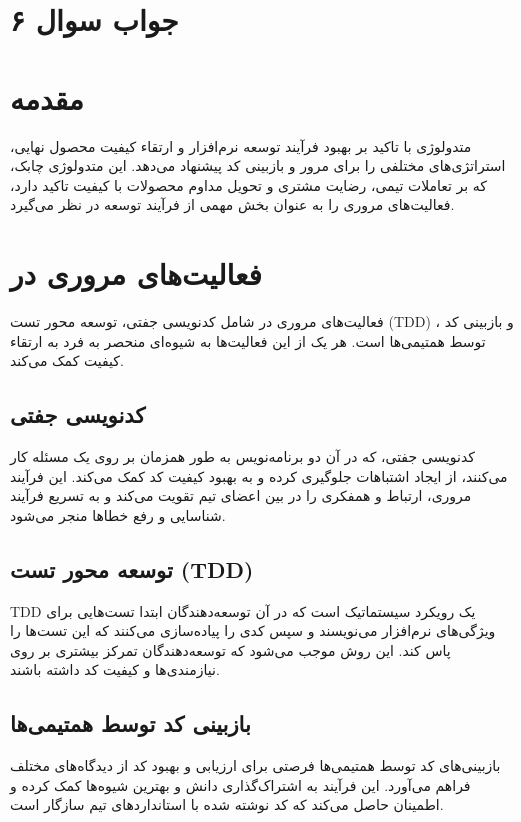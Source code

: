 \section*{جواب سوال ۶}

\section{مقدمه}
متدولوژی
با تاکید بر بهبود فرآیند توسعه نرم‌افزار و ارتقاء کیفیت محصول نهایی، استراتژی‌های مختلفی را برای مرور و بازبینی کد پیشنهاد می‌دهد. این متدولوژی چابک، که بر تعاملات تیمی، رضایت مشتری و تحویل مداوم محصولات با کیفیت تاکید دارد، فعالیت‌های مروری را به عنوان بخش مهمی از فرآیند توسعه در نظر می‌گیرد.

\section{فعالیت‌های مروری در }
فعالیت‌های مروری در  شامل کدنویسی جفتی، توسعه محور تست (TDD) ، و بازبینی کد توسط همتیمی‌ها است. هر یک از این فعالیت‌ها به شیوه‌ای منحصر به فرد به ارتقاء کیفیت کمک می‌کند.

\subsection{کدنویسی جفتی}
کدنویسی جفتی، که در آن دو برنامه‌نویس به طور همزمان بر روی یک مسئله کار می‌کنند، از ایجاد اشتباهات جلوگیری کرده و به بهبود کیفیت کد کمک می‌کند. این فرآیند مروری، ارتباط و همفکری را در بین اعضای تیم تقویت می‌کند و به تسریع فرآیند شناسایی و رفع خطاها منجر می‌شود.

\subsection{توسعه محور تست (TDD)}
TDD
یک رویکرد سیستماتیک است که در آن توسعه‌دهندگان ابتدا تست‌هایی برای ویژگی‌های نرم‌افزار می‌نویسند و سپس کدی را پیاده‌سازی می‌کنند که این تست‌ها را پاس کند. این روش موجب می‌شود که توسعه‌دهندگان تمرکز بیشتری بر روی نیازمندی‌ها و کیفیت کد داشته باشند.

\subsection{بازبینی کد توسط همتیمی‌ها}
بازبینی‌های کد توسط همتیمی‌ها فرصتی برای ارزیابی و بهبود کد از دیدگاه‌های مختلف فراهم می‌آورد. این فرآیند به اشتراک‌گذاری دانش و بهترین شیوه‌ها کمک کرده و اطمینان حاصل می‌کند که کد نوشته شده با استانداردهای تیم سازگار است.

